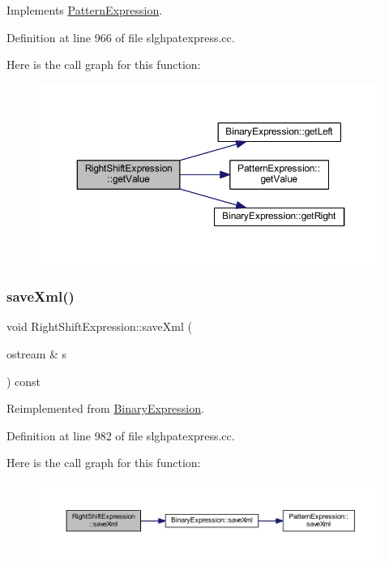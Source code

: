 Implements \mbox{\hyperlink{class_pattern_expression_a8332c6ea4c5a7e9dfc690df2a6458bb8}{Pattern\+Expression}}.



Definition at line 966 of file slghpatexpress.\+cc.

Here is the call graph for this function\+:
\nopagebreak
\begin{figure}[H]
\begin{center}
\leavevmode
\includegraphics[width=350pt]{class_right_shift_expression_af14326c4721f55d083ee08d911b4ffab_cgraph}
\end{center}
\end{figure}
\mbox{\label{class_right_shift_expression_ac5b992fab5ad4df326b2ae9647496828}} 
\subsubsection{\texorpdfstring{saveXml()}{saveXml()}}
{\footnotesize\ttfamily void Right\+Shift\+Expression\+::save\+Xml (\begin{DoxyParamCaption}\item[{ostream \&}]{s }\end{DoxyParamCaption}) const\hspace{0.3cm}{\ttfamily [virtual]}}



Reimplemented from \mbox{\hyperlink{class_binary_expression_a4b9e768a619b713d6c1ff35a618d98ec}{Binary\+Expression}}.



Definition at line 982 of file slghpatexpress.\+cc.

Here is the call graph for this function\+:
\nopagebreak
\begin{figure}[H]
\begin{center}
\leavevmode
\includegraphics[width=350pt]{class_right_shift_expression_ac5b992fab5ad4df326b2ae9647496828_cgraph}
\end{center}
\end{figure}


